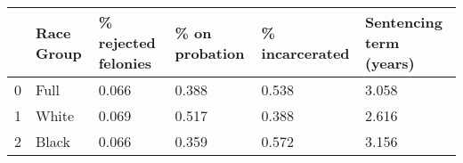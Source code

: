 \begin{tabular}{llllll}
\toprule
{} & Race Group & \% rejected felonies & \% on probation & \% incarcerated & Sentencing term (years) \\
\midrule
0 &       Full &               0.066 &          0.388 &          0.538 &                   3.058 \\
1 &      White &               0.069 &          0.517 &          0.388 &                   2.616 \\
2 &      Black &               0.066 &          0.359 &          0.572 &                   3.156 \\
\bottomrule
\end{tabular}
